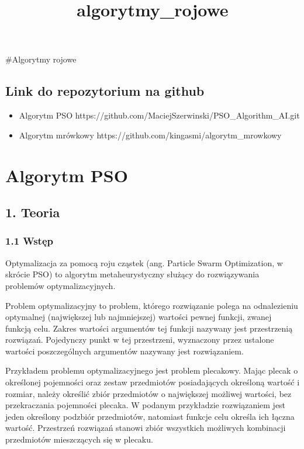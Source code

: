 \documentclass[11pt]{article}
\title{algorytmy\_rojowe}
\providecommand{\tightlist}{%
      \setlength{\itemsep}{0pt}\setlength{\parskip}{0pt}}
\begin{document}
    
    \maketitle
    
    

    
    \#Algorytmy rojowe

    \hypertarget{link-do-repozytorium-na-github}{%
\subsection{Link do repozytorium na
github}\label{link-do-repozytorium-na-github}}

\begin{itemize}
\tightlist
\item
  Algorytm PSO
  https://github.com/MaciejSzerwinski/PSO\_Algorithm\_AI.git
\item
  Algorytm mrówkowy https://github.com/kingasmi/algorytm\_mrowkowy
\end{itemize}

    \hypertarget{algorytm-pso}{%
\section{Algorytm PSO}\label{algorytm-pso}}

    \hypertarget{teoria}{%
\subsection{1. Teoria}\label{teoria}}

\hypertarget{wstux119p}{%
\subsubsection{1.1 Wstęp}\label{wstux119p}}

Optymalizacja za pomocą roju cząstek (ang. Particle Swarm Optimization,
w skrócie PSO) to algorytm metaheurystyczny służący do rozwiązywania
problemów optymalizacyjnych.

Problem optymalizacyjny to problem, którego rozwiązanie polega na
odnalezieniu optymalnej (największej lub najmniejszej) wartości pewnej
funkcji, zwanej funkcją celu. Zakres wartości argumentów tej funkcji
nazywany jest przestrzenią rozwiązań. Pojedynczy punkt w tej
przestrzeni, wyznaczony przez ustalone wartości poszczególnych
argumentów nazywany jest rozwiązaniem.

Przykładem problemu optymalizacyjnego jest problem plecakowy. Mając
plecak o określonej pojemności oraz zestaw przedmiotów posiadających
określoną wartość i rozmiar, należy określić zbiór przedmiotów o
największej możliwej wartości, bez przekraczania pojemności plecaka. W
podanym przykładzie rozwiązaniem jest jeden określony podzbiór
przedmiotów, natomiast funkcje celu określa ich łączna wartość.
Przestrzeń rozwiązań stanowi zbiór wszystkich możliwych kombinacji
przedmiotów mieszczących się w plecaku.
\end{document}
